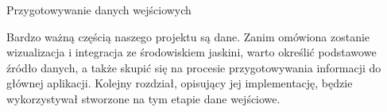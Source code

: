 \begin{chapter}{Przygotowywanie danych wejściowych}
	\newcommand{\chapterPath}{rozdzialy/3_dane}
	\label{ch:dane}

	Bardzo ważną częścią naszego projektu są dane. Zanim omówiona zostanie wizualizacja i integracja ze środowiskiem jaskini, warto określić podstawowe źródło danych, a także skupić się na procesie przygotowywania informacji do głównej aplikacji. Kolejny rozdział, opisujący jej implementację, będzie wykorzystywał stworzone na tym etapie dane wejściowe.

	
	
	
	
	
\end{chapter}
